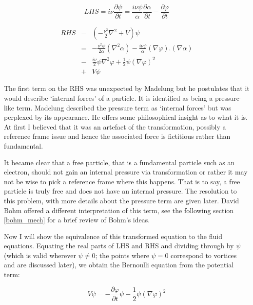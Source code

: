 \begin{equation}
LHS = i\nu\frac{\partial\psi}{\partial t}=\frac{i\nu\psi}{\alpha}\frac{\partial\alpha}{\partial t} - \frac{\partial\varphi}{\partial t}
\end{equation}

\begin{eqnarray}
RHS	&=& \left( -\frac{\nu^2}{2} \nabla^2 + V \right) \psi \\ \nonumber
	&=& -\frac{\nu^2\psi}{2\alpha}(\nabla^2\alpha) -\frac{i\nu\psi}{\alpha}(\nabla\varphi).(\nabla\alpha) \\ \nonumber
	&-&\frac{i\nu}{2}\psi\nabla^2\varphi + \frac{1}{2}\psi(\nabla\varphi)^2 \\ \nonumber
	&+& V \psi
\end{eqnarray}

\noindent The first term on the RHS was unexpected by Madelung but he postulates that it would describe `internal forces' of a particle. It is identified as being a pressure-like term. Madelung described the pressure term as `internal forces' but was perplexed by its appearance. He offers some philosophical insight as to what it is. At first I believed that it was an artefact of the transformation, possibly a reference frame issue and hence the associated force is fictitious rather than fundamental.

It became clear that a free particle, that is a fundamental particle such as an electron, should not gain an internal pressure via transformation or rather it may not be wise to pick a reference frame where this happens.  That is to say, a free particle is truly free and does not have an internal pressure. The resolution to this problem, with more details about the pressure term are given later. David Bohm offered a different interpretation of this term, see the following section \ref{bohm_mech} for a brief review of Bohm's ideas.

Now I will show the equivalence of this transformed equation to the fluid equations. Equating the real parts of LHS and RHS and dividing through by $\psi$ (which is valid wherever $\psi \ne 0$; the points where $\psi = 0$ correspond to vortices and are discussed later), we obtain the Bernoulli equation from the potential term:

\begin{equation}
\label{eqn_bernoulli}
 V\psi = -\frac{\partial\varphi}{\partial t}\psi - \frac{1}{2}\psi(\nabla\varphi)^2
\end{equation}

